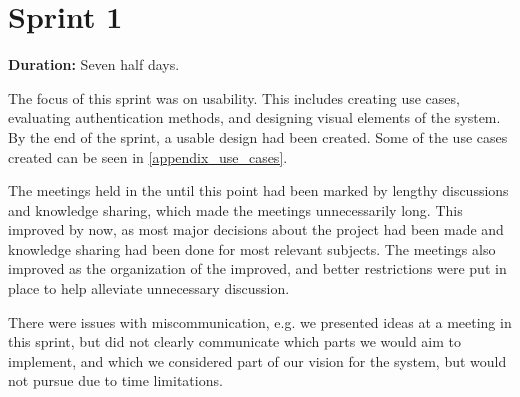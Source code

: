 \section*{Sprint 1}%
\label{iterative:sprint1}

\textbf{Duration:} Seven half days. \newline

The focus of this sprint was on usability. 
This includes creating use cases, evaluating authentication methods, and designing visual elements of the system. 
By the end of the sprint, a usable design had been created. 
Some of the use cases created can be seen in \autoref{appendix_use_cases}. 

The meetings held in the \globalgroup{} until this point had been marked by lengthy discussions and knowledge sharing, which made the meetings unnecessarily long. 
This improved by now, as most major decisions about the project had been made and knowledge sharing had been done for most relevant subjects. 
The meetings also improved as the organization of the \globalgroup{} improved, and better restrictions were put in place to help alleviate unnecessary discussion. 

There were issues with miscommunication, e.g. we presented ideas at a meeting in this sprint, but did not clearly communicate which parts we would aim to implement, and which we considered part of our vision for the system, but would not pursue due to time limitations. 